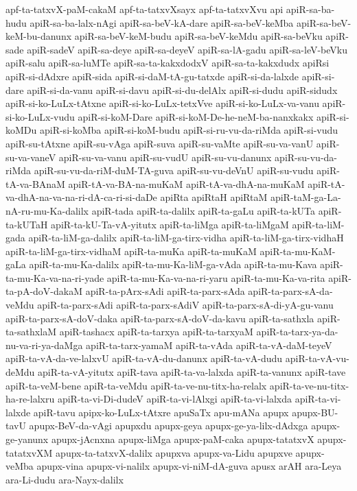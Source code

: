 {apf-ta-tatxvX-paM-cakaM
apf-ta-tatxvXsayx
apf-ta-tatxvXvu
api
apiR-sa-ba-hudu
apiR-sa-ba-lalx-nAgi
apiR-sa-beV-kA-dare
apiR-sa-beV-keMba
apiR-sa-beV-keM-bu-danunx
apiR-sa-beV-keM-budu
apiR-sa-beV-keMdu
apiR-sa-beVku
apiR-sade
apiR-sadeV
apiR-sa-deye
apiR-sa-deyeV
apiR-sa-lA-gadu
apiR-sa-leV-beVku
apiR-salu
apiR-sa-luMTe
apiR-sa-ta-kakxdodxV
apiR-sa-ta-kakxdudx
apiRsi
apiR-si-dAdxre
apiR-sida
apiR-si-daM-tA-gu-tatxde
apiR-si-da-lalxde
apiR-si-dare
apiR-si-da-vanu
apiR-si-davu
apiR-si-du-delAlx
apiR-si-dudu
apiR-sidudx
apiR-si-ko-LuLx-tAtxne
apiR-si-ko-LuLx-tetxVve
apiR-si-ko-LuLx-va-vanu
apiR-si-ko-LuLx-vudu
apiR-si-koM-Dare
apiR-si-koM-De-he-neM-ba-nanxkakx
apiR-si-koMDu
apiR-si-koMba
apiR-si-koM-budu
apiR-si-ru-vu-da-riMda
apiR-si-vudu
apiR-su-tAtxne
apiR-su-vAga
apiR-suva
apiR-su-vaMte
apiR-su-va-vanU
apiR-su-va-vaneV
apiR-su-va-vanu
apiR-su-vudU
apiR-su-vu-danunx
apiR-su-vu-da-riMda
apiR-su-vu-da-riM-duM-TA-guva
apiR-su-vu-deVnU
apiR-su-vudu
apiR-tA-va-BAnaM
apiR-tA-va-BA-na-muKaM
apiR-tA-va-dhA-na-muKaM
apiR-tA-va-dhA-na-va-na-ri-dA-ca-ri-si-daDe
apiRta
apiRtaH
apiRtaM
apiR-taM-ga-La-nA-ru-mu-Ka-dalilx
apiR-tada
apiR-ta-dalilx
apiR-ta-gaLu
apiR-ta-kUTa
apiR-ta-kUTaH
apiR-ta-kU-Ta-vA-yitutx
apiR-ta-liMga
apiR-ta-liMgaM
apiR-ta-liM-gada
apiR-ta-liM-ga-dalilx
apiR-ta-liM-ga-tirx-vidha
apiR-ta-liM-ga-tirx-vidhaH
apiR-ta-liM-ga-tirx-vidhaM
apiR-ta-muKa
apiR-ta-muKaM
apiR-ta-mu-KaM-gaLa
apiR-ta-mu-Ka-dalilx
apiR-ta-mu-Ka-liM-ga-vAda
apiR-ta-mu-Kava
apiR-ta-mu-Ka-va-na-ri-yade
apiR-ta-mu-Ka-va-na-ri-yaru
apiR-ta-mu-Ka-va-rita
apiR-ta-pA-doV-dakaM
apiR-ta-pArx-sAdi
apiR-ta-parx-sAda
apiR-ta-parx-sA-da-veMdu
apiR-ta-parx-sAdi
apiR-ta-parx-sAdiV
apiR-ta-parx-sA-di-yA-gu-vanu
apiR-ta-parx-sA-doV-daka
apiR-ta-parx-sA-doV-da-kavu
apiR-ta-sathxla
apiR-ta-sathxlaM
apiR-tashacx
apiR-ta-tarxya
apiR-ta-tarxyaM
apiR-ta-tarx-ya-da-nu-va-ri-ya-daMga
apiR-ta-tarx-yamaM
apiR-ta-vAda
apiR-ta-vA-daM-teyeV
apiR-ta-vA-da-ve-lalxvU
apiR-ta-vA-du-danunx
apiR-ta-vA-dudu
apiR-ta-vA-vu-deMdu
apiR-ta-vA-yitutx
apiR-tava
apiR-ta-va-lalxda
apiR-ta-vanunx
apiR-tave
apiR-ta-veM-bene
apiR-ta-veMdu
apiR-ta-ve-nu-titx-ha-relalx
apiR-ta-ve-nu-titx-ha-re-lalxru
apiR-ta-vi-Di-dudeV
apiR-ta-vi-lAlxgi
apiR-ta-vi-lalxda
apiR-ta-vi-lalxde
apiR-tavu
apipx-ko-LuLx-tAtxre
apuSaTx
apu-mANa
apupx
apupx-BU-tavU
apupx-BeV-da-vAgi
apupxdu
apupx-geya
apupx-ge-ya-lilx-dAdxga
apupx-ge-yanunx
apupx-jAcnxna
apupx-liMga
apupx-paM-caka
apupx-tatatxvX
apupx-tatatxvXM
apupx-ta-tatxvX-dalilx
apupxva
apupx-va-Lidu
apupxve
apupx-veMba
apupx-vina
apupx-vi-nalilx
apupx-vi-niM-dA-guva
apusx
arAH
ara-Leya
ara-Li-dudu
ara-Nayx-dalilx
}
